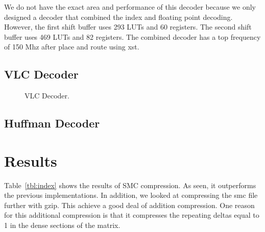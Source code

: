 We do not have the exact area and performance of this decoder because we only designed a decoder that combined the index and floating point decoding. However, the first shift buffer uses 293 LUTs and 60 registers. The second shift buffer uses 469 LUTs and 82 registers. The combined decoder has a top frequency of 150 Mhz after place and route using xst.

\subsection{VLC Decoder}
\begin{figure}
    \centering
    \caption{VLC Decoder.}
    \label{fig:vlc_decoder}
\end{figure}


\subsection{Huffman Decoder}

\section{Results}
\label{sec:smc_discussion}

Table~\ref{tbl:index}  shows the results of SMC compression. As seen, it outperforms the previous implementations. In addition, we looked at compressing the smc file further with gzip. This achieve a good deal of addition compression. One reason for this additional compression is that it compresses the repeating deltas equal to 1 in the dense sections of the matrix.
